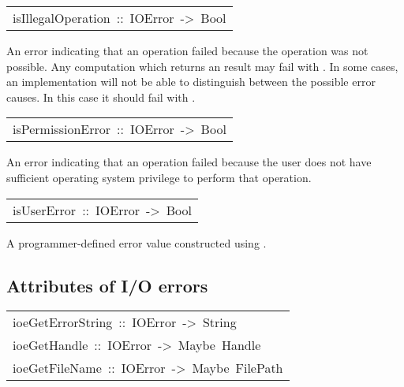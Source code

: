 \begin{haddockdesc}
\item[\begin{tabular}{@{}l}
isIllegalOperation\ ::\ IOError\ ->\ Bool
\end{tabular}]\haddockbegindoc
An error indicating that an  operation failed because
 the operation was not possible.
 Any computation which returns an  result may fail with
 .  In some cases, an implementation will not be
 able to distinguish between the possible error causes.  In this case
 it should fail with .
\par

\end{haddockdesc}
\begin{haddockdesc}
\item[\begin{tabular}{@{}l}
isPermissionError\ ::\ IOError\ ->\ Bool
\end{tabular}]\haddockbegindoc
An error indicating that an  operation failed because
 the user does not have sufficient operating system privilege
 to perform that operation.
\par

\end{haddockdesc}
\begin{haddockdesc}
\item[\begin{tabular}{@{}l}
isUserError\ ::\ IOError\ ->\ Bool
\end{tabular}]\haddockbegindoc
A programmer-defined error value constructed using .
\par

\end{haddockdesc}
\subsection{Attributes of I/O errors
}
\begin{haddockdesc}
\item[\begin{tabular}{@{}l}
ioeGetErrorString\ ::\ IOError\ ->\ String\\ioeGetHandle\ ::\ IOError\ ->\ Maybe\ Handle\\ioeGetFileName\ ::\ IOError\ ->\ Maybe\ FilePath
\end{tabular}]
\end{haddockdesc}
